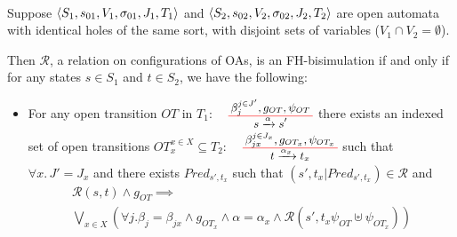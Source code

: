 \documentclass[runningheads]{llncs}
\begin{document}
 \begin{definition}\label{def-FH-bisim} ~\\
\noindent
	Suppose  $\OAg[1]$ and $\OAg[2]$
   are open automata with identical holes of the same sort, with disjoint sets of variables ($V_1\cap V_2=\emptyset$).  

 Then 
$\mathcal{R}$, a relation on configurations of OAs, is an FH-bisimulation if and only if for any  states
$s\in{S}_1$ and $t\in{S}_2$, we 
have
the following:

 \begin{itemize}
 \item   
For any open transition $OT$ in ${T}_1$:
$
     \OTbase{s \xrightarrow{\alpha} s'}
         {
           \beta_j^{j\in J'}}{g_{OT}}{\psi_{OT}}
$
 there exists an indexed set of  open transitions $OT_x^{x\in X} \subseteq {T}_2$:
$
    \OTbase{t \xrightarrow{\alpha_x} t_x}
         {
           \beta_{j x}^{j\in J_{x}}}{ g_{OT_x}}{\psi_{OT_x}}   
$
 such that  $\forall x.\, J'=J_{x}$ and there exists $Pred_{s',t_x}$ such that $(s',t_x|Pred_{s',t_x})\in 
 \mathcal{R}$
 and  
\begin{multline*}
 \mathcal{R}(s,t) \land g_{OT}\implies\\
 \displaystyle{\bigvee_{x\in X}
   \left( \forall j. \beta_j=\beta_{jx}  \land g_{OT_x}
     \land \alpha\!=\!\alpha_x \land  
     \mathcal{R}\left(s',t_x{\psi_{OT}\!\uplus\!\psi_{OT_x}}\right)\right)}
\end{multline*}
%




\end{itemize}
\end{definition}
\end{document}
